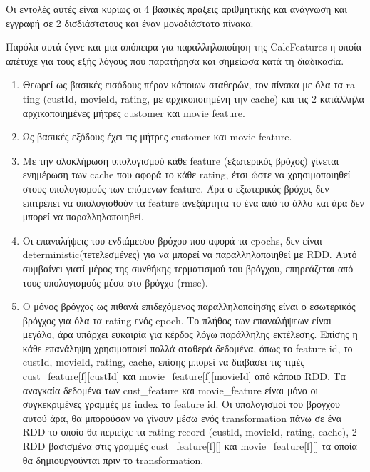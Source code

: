 \documentclass{report}
\begin{document}
{Οι εντολές αυτές είναι κυρίως οι 4 βασικές πράξεις αριθμητικής και ανάγνωση και εγγραφή σε 2 δισδιάστατους και έναν μονοδιάστατο πίνακα.

Παρόλα αυτά έγινε και μια απόπειρα για παραλληλοποίηση της \textlatin{CalcFeatures} η οποία απέτυχε για τους εξής λόγους που παρατήρησα και σημείωσα κατά τη διαδικασία.

\begin{enumerate}
  \item Θεωρεί ως βασικές εισόδους πέραν κάποιων σταθερών, τον πίνακα με όλα τα \textlatin{rating (custId, movieId, rating,} με αρχικοποιημένη την \textlatin{cache}) και τις 2 κατάλληλα αρχικοποιημένες μήτρες \textlatin{customer} και \textlatin{movie feature}.
  \item Ως βασικές εξόδους έχει τις μήτρες customer και movie feature.
  \item Με την ολοκλήρωση υπολογισμού κάθε \textlatin{feature} (εξωτερικός βρόχος) γίνεται ενημέρωση των \textlatin{cache} που αφορά το κάθε \textlatin{rating}, έτσι ώστε να χρησιμοποιηθεί στους υπολογισμούς των επόμενων \textlatin{feature}. Άρα ο εξωτερικός βρόχος δεν επιτρέπει να υπολογισθούν τα \textlatin{feature} ανεξάρτητα το ένα από το άλλο και άρα δεν μπορεί να παραλληλοποιηθεί.
  \item Οι επαναλήψεις του ενδιάμεσου βρόχου που αφορά τα \textlatin{epochs}, δεν είναι \textlatin{deterministic}(τετελεσμένες) για να μπορεί να παραλληλοποιηθεί με \textlatin{RDD}. Αυτό συμβαίνει γιατί μέρος της συνθήκης τερματισμού του βρόγχου, επηρεάζεται από τους υπολογισμούς μέσα στο βρόγχο (\textlatin{rmse}).
  \item O μόνος βρόγχος ως πιθανά επιδεχόμενος παραλληλοποίησης είναι ο εσωτερικός βρόγχος για όλα τα \textlatin{rating} ενός \textlatin{epoch}. Το πλήθος των επαναλήψεων είναι μεγάλο, άρα υπάρχει ευκαιρία για κέρδος λόγω παράλληλης εκτέλεσης. Επίσης η κάθε επανάληψη χρησιμοποιεί πολλά σταθερά δεδομένα, όπως το \textlatin{feature id}, το \textlatin{custId}, \textlatin{movieId, rating, cache,} επίσης μπορεί να διαβάσει τις τιμές \textlatin{cust\_feature[f][custId]} και \textlatin{movie\_feature[f][movieId]} από κάποιο \textlatin{RDD}. Τα αναγκαία δεδομένα των \textlatin{cust\_feature} και \textlatin{movie\_feature} είναι μόνο οι συγκεκριμένες γραμμές με \textlatin{index} το \textlatin{feature id}. Οι υπολογισμοί του βρόγχου αυτού άρα, θα μπορούσαν να γίνουν μέσω ενός \textlatin{transformation} πάνω σε ένα \textlatin{RDD} το οποίο θα περιείχε τα \textlatin{rating record (custId, movieId, rating, cache)}, 2 \textlatin{RDD} βασισμένα στις γραμμές \textlatin{cust\_feature[f][]} και \textlatin{movie\_feature[f][]} τα οποία θα δημιουργούνται πριν το \textlatin{transformation}.

\end{enumerate}}
\end{document}
